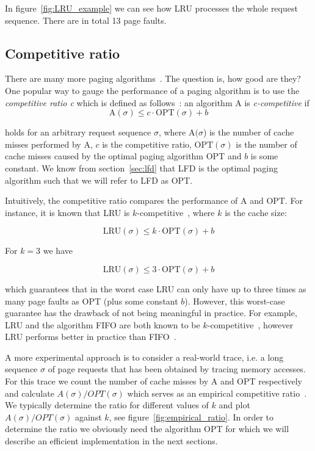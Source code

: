 \documentclass[a4paper,12pt, titlepage]{article}  %
\begin{document}
\noindent In figure~\ref{fig:LRU_example} we can see how LRU processes the whole request sequence.
There are in total 13 page faults.



\subsection{Competitive ratio}
There are many more paging algorithms~\cite{albers03_survey}. The question is, how good are they? One popular way to 
gauge the performance of a paging algorithm is to use the \emph{competitive ratio c} which is defined
as follows~\cite{albers99_brics}: 
an algorithm A is \emph{c-competitive} if 
\[ 
\text{A}(\sigma) \leq c \cdot \text{OPT}(\sigma) + b 
\]

\noindent holds for an arbitrary request sequence $\sigma$, where $\text{A}(\sigma$) is the number of cache misses performed by
A, $c$ is the competitive ratio, $\text{OPT}(\sigma)$ is the number of cache misses caused by the optimal paging algorithm OPT and $b$ is some constant. We know from section~\ref{sec:lfd} that LFD is the optimal paging algorithm such that we will refer to LFD as OPT.

Intuitively, the competitive ratio compares the performance of A and OPT. For instance, it is known that LRU 
is $k$-competitive~\cite{sleator85}, where $k$ is the cache size:

\[ \text{LRU}(\sigma) \leq k \cdot \text{OPT}(\sigma) + b \]

\noindent For $k=3$ we have 

\[ \text{LRU}(\sigma) \leq 3 \cdot \text{OPT}(\sigma) + b \]

\noindent which guarantees that in the worst case LRU can only have up to three times as many page faults
as OPT (plus some constant $b$). However, this worst-case guarantee has the drawback of not being 
meaningful in practice. For example, LRU and the algorithm FIFO are both known to be $k$-competitive~\cite{sleator85}, however
LRU performs better in practice than FIFO~\cite{chrobak99}. 

A more experimental approach is to consider a real-world trace, i.e. a long sequence $\sigma$ of page 
requests that has been obtained by tracing memory accesses. For this trace we count the 
number of cache misses by A and OPT respectively and calculate $A(\sigma)/OPT(\sigma)$ which serves
as an empirical competitive ratio~\cite{moruz_soda12}. We typically determine the ratio for different values of $k$ and
plot $A(\sigma)/OPT(\sigma)$ against $k$, see figure~\ref{fig:empirical_ratio}. In order to determine the ratio we obviously need the algorithm OPT for which we will describe an efficient implementation in the next sections. 
\end{document}
